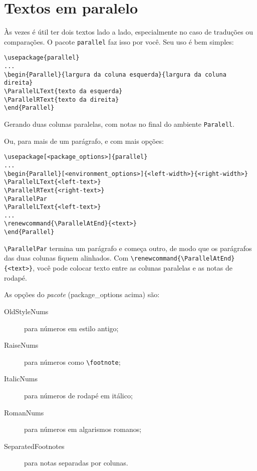\section{Textos em paralelo}
\label{paralelo}

Às vezes é útil ter dois textos lado a lado, especialmente no caso de traduções ou comparações.
O pacote \texttt{parallel} faz isso por você.
Seu uso é bem simples:

\begin{verbatim}
\usepackage{parallel}
...
\begin{Parallel}{largura da coluna esquerda}{largura da coluna direita}
\ParallelLText{texto da esquerda}
\ParallelRText{texto da direita}
\end{Parallel}
\end{verbatim}

Gerando duas colunas paralelas, com notas no final do ambiente \texttt{Paralell}.

Ou, para mais de um parágrafo, e com mais opções:

\begin{verbatim}
\usepackage[<package_options>]{parallel}
...
\begin{Parallel}[<environment_options>]{<left-width>}{<right-width>}
\ParallelLText{<left-text>}
\ParallelRText{<right-text>}
\ParallelPar
\ParallelLText{<left-text>}
...
\renewcommand{\ParallelAtEnd}{<text>}
\end{Parallel}
\end{verbatim}

\verb+\ParallelPar+ termina um parágrafo e começa outro, de modo que os parágrafos das duas colunas fiquem alinhados.
Com \verb+\renewcommand{\ParallelAtEnd}{<text>}+, você pode colocar texto entre as colunas paralelas e as notas de rodapé. 

\medskip

As opções do \textit{pacote} (\textsf{package\_options} acima) são:

\begin{description}
\item[OldStyleNums] para números em estilo antigo;
\item[RaiseNums] para números como \verb+\footnote+;
\item[ItalicNums] para números de rodapé em itálico;
\item[RomanNums] para números em algarismos romanos;
\item[SeparatedFootnotes] para notas separadas por colunas.
\end{description}

